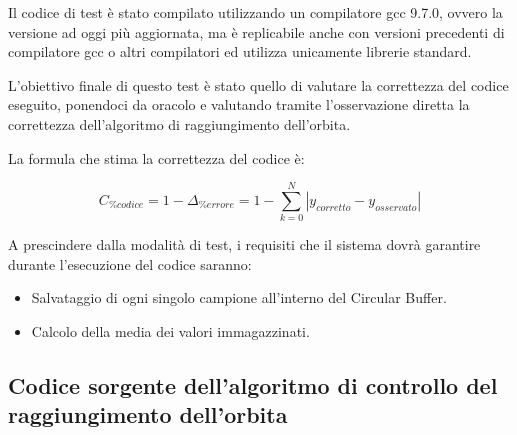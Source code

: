 \documentclass[LaM,binding=0.6cm,oneside]{../sapthesis}
\begin{document}
Il codice di test è stato compilato utilizzando un compilatore gcc 9.7.0, ovvero la versione ad oggi più aggiornata, ma è replicabile anche con versioni precedenti di compilatore gcc o altri compilatori ed utilizza unicamente librerie standard.

L'obiettivo finale di questo test è stato quello di valutare la correttezza del codice eseguito, ponendoci da oracolo e valutando tramite l'osservazione diretta la correttezza dell'algoritmo di raggiungimento dell'orbita.

La formula che stima la correttezza del codice è:

\begin{equation}
     C_{\% codice}  = 1 - \Delta_{\% errore} = 1 - \sum_{k=0}^{N} | y_{corretto} - y_{osservato} |
\end{equation}

A prescindere dalla modalità di test, i requisiti che il sistema dovrà garantire durante l'esecuzione del codice saranno:
\begin{itemize}
    \item Salvataggio di ogni singolo campione all'interno del Circular Buffer.
    
    \item Calcolo della media dei valori immagazzinati.
\end{itemize}


\subsection{Codice sorgente dell'algoritmo di controllo del raggiungimento dell'orbita}
\end{document}
